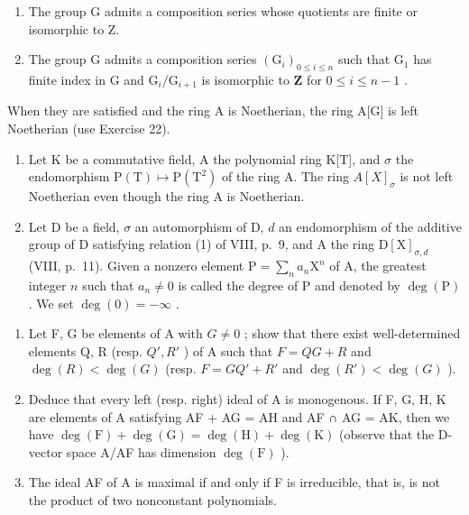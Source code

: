 \begin{enumerate}
\def\labelenumi{(\roman{enumi})}
\item
  The group G admits a composition series whose quotients are finite or isomorphic to Z.
\item
  The group G admits a composition series \((\mathrm{G}_i)_{0\leqslant i\leqslant n}\) such that \(\mathrm{G}_1\) has finite index in G and \(\mathrm{G}_i / \mathrm{G}_{i + 1}\) is isomorphic to \(\mathbf{Z}\) for \(0\leqslant i\leqslant n - 1\) .
\end{enumerate}

When they are satisfied and the ring A is Noetherian, the ring A{[}G{]} is left Noetherian (use Exercise 22).

\begin{enumerate}
\def\labelenumi{\arabic{enumi})}
\setcounter{enumi}{25}
\item
  Let K be a commutative field, A the polynomial ring K{[}T{]}, and \(\sigma\) the endomorphism \(\mathrm{P(T)}\mapsto\mathrm{P(T^{2})}\) of the ring A. The ring \(A[X]_{\sigma}\) is not left Noetherian even though the ring A is Noetherian.
\item
  Let D be a field, \(\sigma\) an automorphism of D, \(d\) an endomorphism of the additive group of D satisfying relation (1) of VIII, p.~9, and A the ring \(\mathrm{D}[\mathrm{X}]_{\sigma,d}\) (VIII, p.~11). Given a nonzero element \(\mathrm{P} = \sum_{n}a_{n}\mathrm{X}^{n}\) of A, the greatest integer \(n\) such that \(a_{n}\neq 0\) is called the degree of P and denoted by \(\deg (\mathrm{P})\) . We set \(\deg (0) = -\infty\) .
\end{enumerate}

\begin{enumerate}
\def\labelenumi{\alph{enumi})}
\item
  Let F, G be elements of A with \(G \neq 0\) ; show that there exist well-determined elements Q, R (resp. \(Q', R'\) ) of A such that \(F = QG + R\) and \(\deg(R) < \deg(G)\) (resp. \(F = GQ' + R'\) and \(\deg(R') < \deg(G)\) ).
\item
  Deduce that every left (resp. right) ideal of A is monogenous. If F, G, H, K are elements of A satisfying AF + AG = AH and AF ∩ AG = AK, then we have \(\deg(\mathrm{F}) + \deg(\mathrm{G}) = \deg(\mathrm{H}) + \deg(\mathrm{K})\) (observe that the D-vector space A/AF has dimension \(\deg(\mathrm{F})\) ).
\item
  The ideal AF of A is maximal if and only if F is irreducible, that is, is not the product of two nonconstant polynomials.
\end{enumerate}

